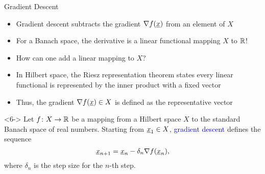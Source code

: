 \documentclass[10pt,english,aspectratio=169]{beamer}
\begin{document}
\begin{frame}{Gradient Descent}

\begin{itemize}
\setlength\itemsep{1.5mm}
\item<1-> Gradient descent subtracts the gradient $\nabla f(\underline{x})$ from an element of $X\!\!\!$

\item<2-> For a Banach space, the derivative is a linear functional mapping $X$ to $\mathbb{R}$!

\item<3-> How can one add a linear mapping to $X$?

\item<4-> In Hilbert space, the Riesz representation theorem states every linear functional is represented by the inner product with a fixed vector

\item<5-> Thus, the gradient $\nabla f (\underline{x}) \in X$ is defined as the representative vector
\end{itemize}

\begin{definition}<6->
Let $f \colon X \rightarrow \mathbb{R}$ be a mapping from a Hilbert space $X$ to the standard Banach space of real numbers.
Starting from $\underline{x}_1 \in X$, \textcolor{blue}{gradient descent} defines the sequence \vspace{-1mm}
\[ \underline{x}_{n+1} = \underline{x}_n - \delta_n \nabla f(\underline{x}_n), \]
where $\delta_n$ is the step size for the $n$-th step.
\end{definition}

\end{frame}
\end{document}

